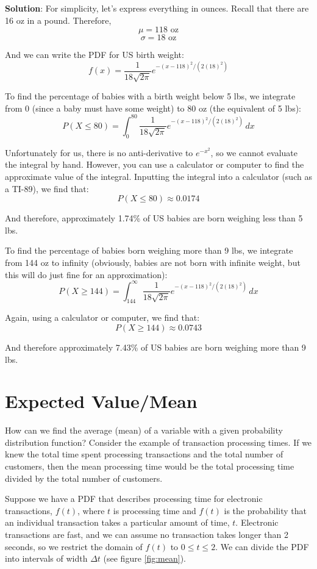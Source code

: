 \textbf{Solution}: For simplicity, let's express everything in ounces. Recall 
that there are 16 oz in a pound. Therefore, 
$$\mu = 118\text{ oz}$$
$$\sigma = 18\text{ oz}$$

And we can write the PDF for US birth weight:
$$f(x) = \frac{1}{18\sqrt{2\pi}}e^{-\left(x - 118 \right)^2/\left(2 \left( 18 
\right)^2 \right)}$$

To find the percentage of babies with a birth weight below 5 lbs, we integrate 
from 0 (since a baby must have some weight) to 80 oz (the equivalent of 5 lbs):
$$P(X \leq 80) = \int_0^{80} \frac{1}{18\sqrt{2\pi}}e^{-\left(x - 118 \right)^2/
\left(2 \left( 18 \right)^2 \right)}\,dx$$

Unfortunately for us, there is no anti-derivative to $e^{-x^2}$, so we cannot 
evaluate the integral by hand. However, you can use a calculator or computer 
to find the approximate value of the integral. Inputting the integral into a 
calculator (such as a TI-89), we find that:
$$P(X \leq 80) \approx 0.0174$$

And therefore, approximately 1.74\% of US babies are born weighing less than 5 
lbs. 

To find the percentage of babies born weighing more than 9 lbs, we integrate 
from 144 oz to infinity (obviously, babies are not born with infinite weight, 
but this will do just fine for an approximation):
$$P(X \geq 144) = \int_{144}^{\infty} \frac{1}{18\sqrt{2\pi}}e^{-\left(x - 118 
\right)^2/\left(2 \left( 18 \right)^2 \right)}\,dx$$

Again, using a calculator or computer, we find that:
$$P(X \geq 144) \approx 0.0743$$

And therefore approximately 7.43\% of US babies are born weighing more than 9 
lbs. 

\section{Expected Value/Mean}
How can we find the average (mean) of a variable with a given probability 
distribution function? Consider the example of transaction processing times. 
If we knew the total time spent processing transactions and the total number 
of customers, then the mean processing time would be the total processing time 
divided by the total number of customers. 

Suppose we have a PDF that describes processing time for electronic 
transactions, $f(t)$, where $t$ is processing time and $f(t)$ is the 
probability that an individual transaction takes a particular amount of time, 
$t$. Electronic transactions are fast, and we can assume no transaction takes 
longer than 2 seconds, so we restrict the domain of $f(t)$ to $0 \leq t \leq 
2$. We can divide the PDF into intervals of width $\Delta t$ (see figure 
\ref{fig:mean}). 

